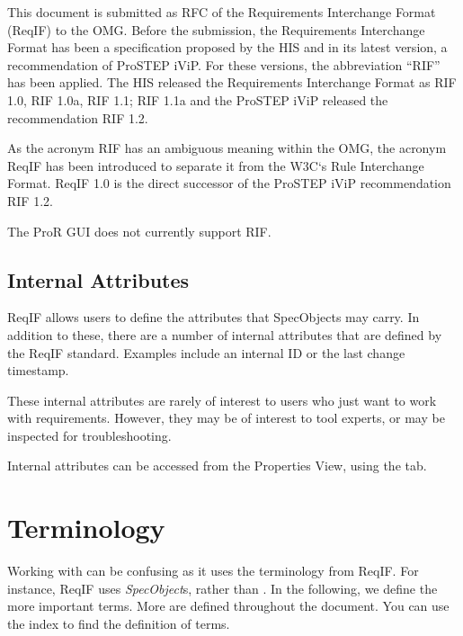 This document is submitted as RFC of the Requirements Interchange Format (ReqIF) to the OMG.  Before the submission, the Requirements Interchange Format has been a specification proposed by the HIS and in its latest version, a recommendation of ProSTEP iViP.  For these versions, the abbreviation ``RIF'' has been applied.  The HIS released the Requirements Interchange Format as RIF 1.0, RIF 1.0a, RIF 1.1; RIF 1.1a and the ProSTEP iViP released the recommendation RIF 1.2.

As the acronym RIF has an ambiguous meaning within the OMG, the acronym ReqIF has been introduced to separate it from the W3C`s Rule Interchange Format.  ReqIF 1.0 is the direct successor of the ProSTEP iViP recommendation RIF 1.2.

\begin{warning}
The ProR GUI does not currently support RIF.
\end{warning}

\subsection{Internal Attributes}
\label{sec:reqif_internal_attributes}

ReqIF allows users to define the attributes that SpecObjects may carry.  In addition to these, there are a number of internal attributes that are defined by the ReqIF standard.  Examples include an internal ID or the last change timestamp.

These internal attributes are rarely of interest to users who just want to work with requirements.  However, they may be of interest to tool experts, or may be inspected for troubleshooting.

Internal attributes can be accessed from the Properties View, using the  tab.

\section{Terminology}
\label{sec:terminology}

Working with \pror{} can be confusing as it uses the terminology from ReqIF.  For instance, ReqIF uses \textit{SpecObject}s, rather than .  In the following, we define the more important terms.  More are defined throughout the document.  You can use the index to find the definition of terms.

